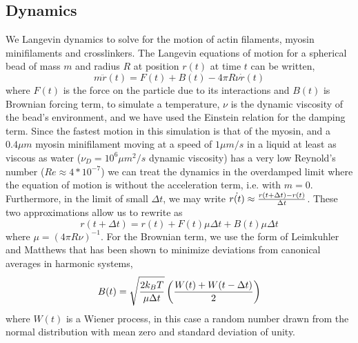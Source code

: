 \documentclass[12pt]{article}
\begin{document}
\subsection{Dynamics}
We Langevin dynamics to solve for the motion of actin filaments, myosin minifilaments and crosslinkers.
The Langevin equations of motion for a spherical bead of
mass $m$ and radius $R$ at position $r(t)$ at time $t$ can be written,
\begin{equation}
  m\ddot{r}(t) = F(t) + B(t) - 4\pi R\nu \dot{r}(t)
  \label{eqn:lang}
\end{equation} 
where $F(t)$ is the force on the particle due to its interactions and $B(t)$ is Brownian forcing term, to simulate a temperature, $\nu$ is the dynamic viscosity of the bead's
environment, and we have used the Einstein relation for the damping term.  
Since the fastest motion in this simulation is that of the myosin, and a $0.4\mu m$ myosin minifilament moving at
a speed of $1\mu m/s$ in a liquid at least as viscous as water ($\nu_D=10^6\mu m^2/s$ dynamic viscosity) has a very low Reynold's
number ($Re \approx 4*10^{-7}$) we can treat the dynamics in the overdamped limit where the equation of motion is  without the acceleration term, i.e. with $m=0$.
Furthermore, in the limit of small $\Delta t$, we may write $\dot{r(t)} \approx {r(t+\Delta t)-r(t)\over \Delta t}$. These two
approximations allow us to rewrite  as 
\begin{equation}  
  r(t+\Delta t) = r(t) + F(t)\mu \Delta t + B(t) \mu \Delta t
\label{eqn:overdamped}
\end{equation}
where $\mu = (4\pi R\nu)^{-1}$. For the Brownian term, we use the form of Leimkuhler and Matthews \cite{leimkuhler2012,leimkuhler2013} that has
been shown to minimize deviations from canonical averages in harmonic systems,
\begin{equation}
  B(t)=\sqrt{2k_BT\over\mu \Delta t}\left({W(t)+W(t-\Delta t)\over2}\right)
  \label{eqn:baoab_brownian}
\end{equation} 
where $W(t)$ is a Wiener process, in this case a random number drawn from the normal distribution with mean zero and standard deviation of unity.
\end{document}
